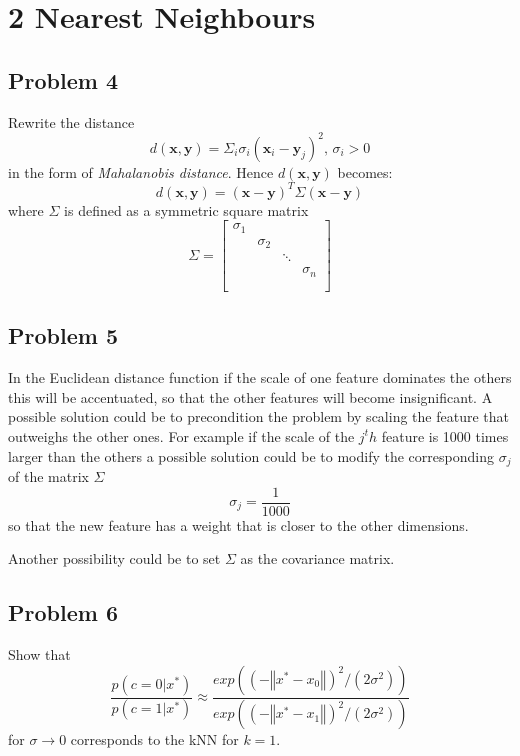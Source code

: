 \section*{2 Nearest Neighbours}

\subsection*{Problem 4}
Rewrite the distance
\[
    d(\mathbf{x}, \mathbf{y}) = 
    \Sigma_i \sigma_i (\mathbf{x}_i - \mathbf{y}_j)^2, \, \sigma_i > 0
\]
in the form of \textit{Mahalanobis distance}. Hence $d(\mathbf{x}, \mathbf{y})$
becomes:
\[
    d(\mathbf{x}, \mathbf{y}) = 
    (\mathbf{x} - \mathbf{y})^T \Sigma (\mathbf{x} - \mathbf{y}) 
\]
where $\Sigma$ is defined as a symmetric square matrix
\[
\Sigma =
\left[
    \begin{array}{ccccc}
        \sigma_1\\
        & \sigma_2\\
        &  & \ddots\\
        &  &  & \sigma_n\\
        \\
    \end{array}
\right]
\]

\subsection*{Problem 5} 
In the Euclidean distance function if the scale of one feature dominates the
others this will be accentuated, so that the other features will become
insignificant.
A possible solution could be to precondition the problem by scaling the feature
that outweighs the other ones. For example if the scale of the $j^th$ feature is
1000 times larger than the others a possible solution could be to modify the
corresponding $\sigma_j$ of the matrix $\Sigma$ 
\[
    \sigma_j = \frac{1}{1000}
\]
so that the new feature has a weight that is closer to the other dimensions.

Another possibility could be to set $\Sigma$ as the covariance matrix.


\subsection*{Problem 6} 
Show that 
\[
    \frac{p(c=0 | x^*)}{p(c=1 | x^*)} \approx 
    \frac{exp((-\left\Vert x^* - x_0 \right\Vert)^2/(2\sigma^2))}
         {exp((-\left\Vert x^* - x_1 \right\Vert)^2/(2\sigma^2))}
\]
for $\sigma \rightarrow 0 $ corresponds to the kNN for $k = 1$.

